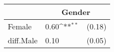 {
\def\sym#1{\ifmmode^{#1}\else\(^{#1}\)\fi}
\begin{tabular*}{.5\hsize}{@{\hskip\tabcolsep\extracolsep\fill}l*{1}{lc}}
\toprule
                &\multicolumn{2}{c}{Gender}  \\
\midrule
Female\hspace{7ex}&     0.60\sym{**} &   (0.18)\\
diff.Male       &     0.10         &   (0.05)\\
\bottomrule
\end{tabular*}
}
